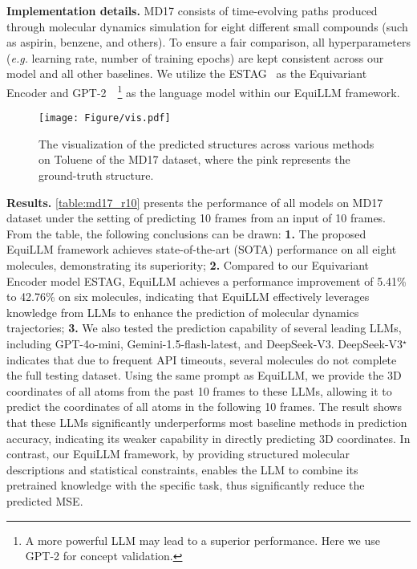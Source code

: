 \textbf{Implementation details.}
MD17 consists of time-evolving paths produced through molecular dynamics simulation for eight different small compounds (such as aspirin, benzene, and others). To ensure a fair comparison, all hyperparameters (\emph{e.g.} learning rate, number of training epochs) are kept consistent across our model and all other baselines. We utilize the ESTAG~\citep{wu2024equivariant} as the Equivariant Encoder and GPT-2~\citep{radford2019language}~\footnote{A more powerful LLM may lead to a superior performance. Here we use GPT-2 for concept validation.} as the language model within our EquiLLM framework.

\begin{figure}
  \centering
  \texttt{[image: Figure/vis.pdf]} 
  \vspace{-1cm}
  \caption{The visualization of the predicted structures across various methods on Toluene of the MD17 dataset, where the pink represents the ground-truth structure.}
  \label{fig:rna_pdf}
\end{figure}

\textbf{Results.}
\cref{table:md17_r10} presents the performance of all models on MD17 dataset under the setting of predicting 10 frames from an input of 10 frames. From the table, the following conclusions can be drawn: \textbf{1.} The proposed EquiLLM framework achieves state-of-the-art (SOTA) performance on all eight molecules, demonstrating its superiority; \textbf{2.} Compared to our Equivariant Encoder model ESTAG, EquiLLM achieves a performance improvement of 5.41\% to 42.76\% on six molecules, indicating that EquiLLM effectively leverages knowledge from LLMs to enhance the prediction of molecular dynamics trajectories; \textbf{3.} We also tested the prediction capability of several leading LLMs, including GPT-4o-mini, Gemini-1.5-flash-latest, and DeepSeek-V3. DeepSeek-V3$^{\star}$ indicates that due to frequent API timeouts, several molecules do not complete the full testing dataset. Using the same prompt as EquiLLM, we provide the 3D coordinates of all atoms from the past 10 frames to these LLMs, allowing it to predict the coordinates of all atoms in the following 10 frames. The result shows that these LLMs significantly underperforms most baseline methods in prediction accuracy, indicating its weaker capability in directly predicting 3D coordinates. In contrast, our EquiLLM framework, by providing structured molecular descriptions and statistical constraints, enables the LLM to combine its pretrained knowledge with the specific task, thus significantly reduce the predicted MSE.

